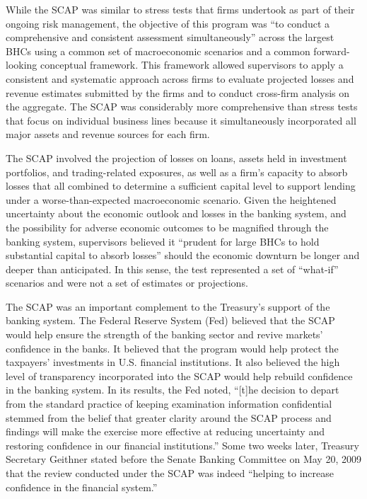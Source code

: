 \documentclass[12pt]{article}
\begin{document}
While the SCAP was similar to stress tests that firms undertook as part
of their ongoing risk management, the objective of this program was ``to
conduct a comprehensive and consistent assessment simultaneously''
across the largest BHCs using a common set of macroeconomic scenarios
and a common forward-looking conceptual framework. This framework
allowed supervisors to apply a consistent and systematic approach across
firms to evaluate projected losses and revenue estimates submitted by
the firms and to conduct cross-firm analysis on the aggregate. The SCAP
was considerably more comprehensive than stress tests that focus on
individual business lines because it simultaneously incorporated all
major assets and revenue sources for each firm.\citep{Design}

The SCAP involved the projection of losses on loans, assets held in
investment portfolios, and trading-related exposures, as well as a
firm's capacity to absorb losses that all combined to determine a
sufficient capital level to support lending under a worse-than-expected
macroeconomic scenario. Given the heightened uncertainty about the
economic outlook and losses in the banking system, and the possibility
for adverse economic outcomes to be magnified through the banking
system, supervisors believed it ``prudent for large BHCs to hold
substantial capital to absorb losses'' should the economic downturn be
longer and deeper than anticipated.\citep{Design} In this sense, the
test represented a set of ``what-if'' scenarios and were not a set of
estimates or projections.\citep{Results}

The SCAP was an important complement to the Treasury's support of the
banking system. The Federal Reserve System (Fed) believed that the SCAP
would help ensure the strength of the banking sector and revive markets'
confidence in the banks. It believed that the program would help protect
the taxpayers' investments in U.S. financial institutions.\citep{Results} It also believed the high level of transparency incorporated into the SCAP would help
rebuild confidence in the banking system. In its results, the Fed noted,
``{[}t{]}he decision to depart from the standard practice of keeping
examination information confidential stemmed from the belief that
greater clarity around the SCAP process and findings will make the
exercise more effective at reducing uncertainty and restoring confidence
in our financial institutions.'' Some two weeks later, Treasury
Secretary Geithner stated before the Senate Banking Committee on
May 20, 2009 that the review conducted under the SCAP was indeed
``helping to increase confidence in the financial system.''
\end{document}
